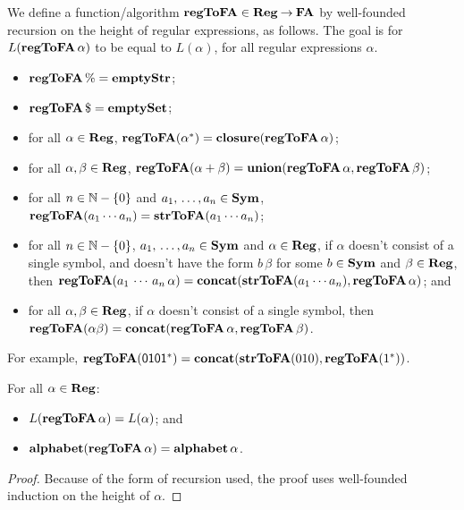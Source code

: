 %
%
We define a function/algorithm $\mathbf{regToFA}\in\mathbf{Reg}\mathbin{\to}\mathbf{FA}$ by well-founded
recursion on the height of regular expressions, as follows.
The goal is for $L(\mathbf{regToFA}\,\alpha)$ to be equal to $L(\alpha)$, for
all regular expressions $\alpha$.
\begin{itemize}
\item $\mathbf{regToFA}\,\% = \mathbf{emptyStr}$;

\item $\mathbf{regToFA}\,\$ = \mathbf{emptySet}$;

\item for all $\alpha\in\mathbf{Reg}$, $\mathbf{regToFA}(\alpha^*) =
  \mathbf{closure}(\mathbf{regToFA}\,\alpha)$;

\item for all $\alpha,\beta\in\mathbf{Reg}$, $\mathbf{regToFA}(\alpha+\beta) =
  \mathbf{union}(\mathbf{regToFA}\,\alpha,\mathbf{regToFA}\,\beta)$;

\item for all $n\in\mathbb{N}-\{0\}$ and $a_1,\,\ldots,a_n\in\mathbf{Sym}$,
  $\mathbf{regToFA}(a_1\cdots a_n)=\mathbf{strToFA}(a_1\cdots a_n)$;

\item for all $n\in\mathbb{N}-\{0\}$, $a_1,\,\ldots,a_n\in\mathbf{Sym}$ and
  $\alpha\in\mathbf{Reg}$, if $\alpha$ doesn't consist of a single symbol, and
  doesn't have the form $b\,\beta$ for some $b\in\mathbf{Sym}$ and
  $\beta\in\mathbf{Reg}$, then $\mathbf{regToFA}(a_1\,\cdots\,a_n\,\alpha)=
  \mathbf{concat}(\mathbf{strToFA}(a_1\cdots a_n),\mathbf{regToFA}\,\alpha)$; and

\item for all $\alpha,\beta\in\mathbf{Reg}$, if $\alpha$ doesn't consist of a
  single symbol, then $\mathbf{regToFA}(\alpha\beta)=
  \mathbf{concat}(\mathbf{regToFA}\,\alpha,\mathbf{regToFA}\,\beta)$.
\end{itemize}

For example, $\mathbf{regToFA}(\mathsf{0101^*})=
\mathbf{concat}(\mathbf{strToFA}(010),\mathbf{regToFA}(1^*))$.

\begin{theorem}
For all $\alpha\in\mathbf{Reg}$:
\begin{itemize}
\item $L(\mathbf{regToFA}\,\alpha)=L(\alpha)$; and

\item $\mathbf{alphabet}(\mathbf{regToFA}\,\alpha)=\mathbf{alphabet}\,\alpha$.
\end{itemize}
\end{theorem}

\begin{proof}
Because of the form of recursion used, the proof uses well-founded
induction on the height of $\alpha$.
\end{proof}


